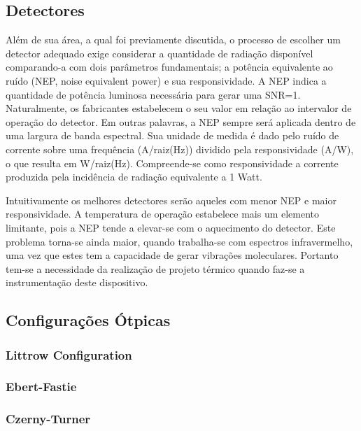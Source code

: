 \documentclass[oneside,openright,12pt]{ufsm_2021} %
\begin{document}
        \subsection{Detectores}
        \par Além de sua área, a qual foi previamente discutida, o processo de escolher um detector adequado \cite{MIT} exige considerar a quantidade de radiação disponível comparando-a com dois parâmetros fundamentais; a potência equivalente ao ruído (NEP, noise equivalent power) e sua responsividade. A NEP indica a quantidade de potência luminosa necessária para gerar uma SNR=1. Naturalmente, os fabricantes estabelecem o seu valor em relação ao intervalor de operação do detector. Em outras palavras, a NEP sempre será aplicada dentro de uma largura de banda espectral. Sua unidade de medida é dado pelo ruído de corrente sobre uma frequência (A/raiz(Hz)) dividido pela responsividade (A/W), o que resulta em W/raiz(Hz). Compreende-se como responsividade a corrente produzida pela incidência de radiação equivalente a 1 Watt. 
        \par Intuitivamente os melhores detectores serão aqueles com menor NEP e maior responsividade.
        A temperatura de operação estabelece mais um elemento limitante, pois a NEP tende a elevar-se com o aquecimento do detector. Este problema torna-se ainda maior, quando trabalha-se com espectros infravermelho, uma vez que estes tem a capacidade de gerar vibrações moleculares. Portanto tem-se a necessidade da realização de projeto térmico quando faz-se a instrumentação deste dispositivo. 
        
        \subsection{Configurações Ótpicas}
        \subsubsection{Littrow Configuration}
        \subsubsection{Ebert-Fastie}
        \subsubsection{Czerny-Turner}
\end{document}
